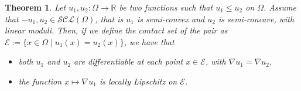 \documentclass[reqno]{amsart}
\theoremstyle{plain}
\newtheorem{thm}{Theorem}[section]
\theoremstyle{definition}
\theoremstyle{remark}
\begin{document}
	\begin{thm}\label{contact_semicon_pair}
		Let $u_1,u_2:\Omega\to\mathbb{R}$ be two functions such that $u_1\leq u_2$ on $\Omega$. Assume that $-u_1,u_2\in \mathcal{SCL}(\Omega)$, that is $u_1$ is semi-convex and $u_2$ is semi-concave, with linear moduli.
        Then, if we define the contact set of the pair as $\mathcal{E}:=\{x\in \Omega\;|\;u_1(x)=u_2(x)\}$, we have that
		\begin{itemize}
			\item both $u_1$ and $u_2$ are differentiable at each point $x\in\mathcal{E}$, with $\nabla u_1=\nabla u_2$,
			\item the function $x\mapsto \nabla u_1$ is locally Lipschitz on $\mathcal{E}$.
		\end{itemize}
	\end{thm}
\end{document}
